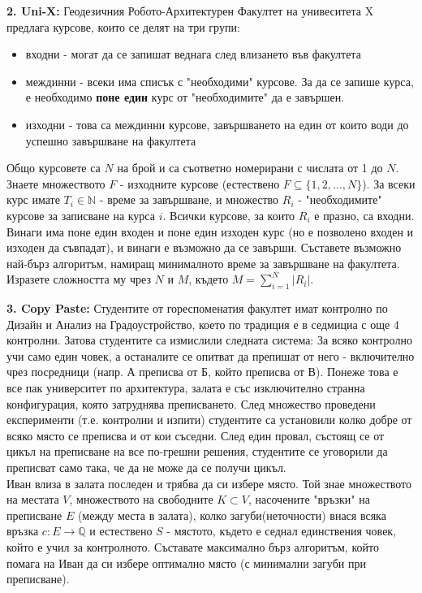 \documentclass[fleqn,12pt]{article}
\begin{document}
\begin{flushleft}
\vspace{10mm}
\textbf{2. Uni-X: } Геодезичния Робото-Архитектурен Факултет на унивеситета X предлага курсове, които се делят на три групи:

\begin{itemize}
	\item входни - могат да се запишат веднага след влизането във факултета
	\item междинни - всеки има списък с "необходими" курсове. За да се запише курса, е необходимо \textbf{поне един} курс от "необходимите" да е завършен.
	\item изходни - това са междинни курсове, завършването на един от които води до успешно завършване на факултета
\end{itemize}

Общо курсовете са $N$ на брой и са съответно номерирани с числата от 1 до $N$. Знаете множеството $F$ - изходните курсове (естествено $F \subseteq \{1,2, \dots, N\}$). За всеки курс имате $T_i \in \mathbb{N}$ - време за завършване, и множество $R_i$ - "необходимите" курсове за записване на курса $i$. Всички курсове, за които $R_i$ е празно, са входни. Винаги има поне един входен и поне един изходен курс (но е позволено входен и изходен да съвпадат), и винаги е възможно да се завърши. Съставете възможно най-бърз алгоритъм, намиращ минималното време за завършване на факултета. Изразете сложността му чрез $N$ и $M$, където $M = \sum_{i=1}^N |R_i|$.

\vspace{10mm}

\textbf{3. Copy Paste:} Студентите от гореспоменатия факултет имат контролно по Дизайн и Анализ на Градоустройство, което по традиция е в седмициа с още 4 контролни. Затова студентите са измислили следната система: За всяко контролно учи само един човек, а останалите се опитват да препишат от него - включително чрез посредници (напр. А преписва от Б, който преписва от В). Понеже това е все пак университет по архитектура, залата е със изключително странна конфигурация, която затруднява преписването. След множество проведени експерименти (т.е. контролни и изпити) студентите са установили колко добре от всяко място се преписва и от кои съседни. След един провал, състоящ се от цикъл на преписване на все по-грешни решения, студентите се уговорили да преписват само така, че да не може да се получи цикъл. \\
\qquad Иван влиза в залата последен и трябва да си избере място. Той знае множеството на местата $V$, множеството на свободните $K \subset V$, насочените "връзки" на преписване $E$ (между места в залата), колко загуби(неточности) внася всяка връзка $c : E \rightarrow \mathbb{Q} $ и естествено $S$ - мястото, където е седнал единствения човек, който е учил за контролното. Съставате максимално бърз алгоритъм, който помага на Иван да си избере оптимално място (с минимални загуби при преписване).

\end{flushleft}
\end{document}
